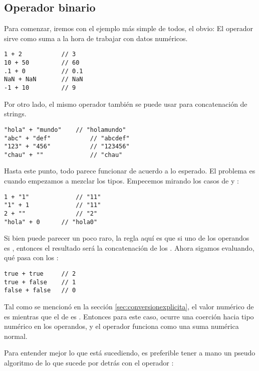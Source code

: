 \subsection{Operador binario}

Para comenzar, iremos con el ejemplo más simple de todos, el obvio: El operador \code{+} sirve como suma a la hora de trabajar con datos numéricos.

\begin{lstlisting}[title={Operador \code{+} en números}]
1 + 2 			// 3
10 + 50 		// 60
.1 + 0			// 0.1
NaN + NaN		// NaN
-1 + 10			// 9
\end{lstlisting}

Por otro lado, el mismo operador también se puede usar para concatenación de strings.

\begin{lstlisting}[title={Operador \code{+} en strings}]
"hola" + "mundo"	// "holamundo"
"abc" + "def"			// "abcdef"
"123" + "456"			// "123456"
"chau" + ""				// "chau"
\end{lstlisting}

Hasta este punto, todo parece funcionar de acuerdo a lo esperado. El problema es cuando empezamos a mezclar los tipos. Empecemos mirando los casos de  y :

\begin{lstlisting}[title={Operador \code{+} mezclando strings con números}]
1 + "1"				// "11"
"1" + 1				// "11"
2 + ""				// "2"
"hola" + 0		// "hola0"
\end{lstlisting}

Si bien puede parecer un poco raro, la regla aquí es que si uno de los operandos es , entonces el resultado será la concatenación de los . Ahora sigamos evaluando, qué pasa con los :

\begin{lstlisting}[title={Operador \code{+} en booleanos}]
true + true		// 2
true + false	// 1
false + false	// 0
\end{lstlisting}

Tal como se mencionó en la sección \ref{sec:conversionexplicita}, el valor numérico de  es  mientras que el de  es . Entonces para este caso, ocurre una coerción hacia tipo numérico en los operandos, y el operador \code{+} funciona como una suma numérica normal.

Para entender mejor lo que está sucediendo, es preferible tener a mano un pseudo algoritmo de lo que sucede por detrás con el operador \code{+}:

